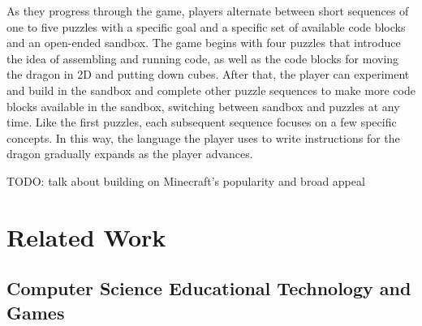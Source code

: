 \documentclass{sig-alternate}
\newcommand{\TODO}[1]{{\color{red} TODO: #1}}
\newcommand{\gametitle}{{\color{RoyalPurple} Dragon Architect Academy}}
\begin{document}
As they progress through the game, players alternate between short sequences of one to five puzzles with a specific goal and a specific set of available code blocks and an open-ended sandbox. 
The game begins with four puzzles that introduce the idea of assembling and running code, as well as the code blocks for moving the dragon in 2D and putting down cubes.
After that, the player can experiment and build in the sandbox and complete other puzzle sequences to make more code blocks available in the sandbox, switching between sandbox and puzzles at any time. 
Like the first puzzles, each subsequent sequence focuses on a few specific concepts. 
In this way, the language the player uses to write instructions for the dragon gradually expands as the player advances.

\TODO{talk about building on Minecraft's popularity and broad appeal}





\section{Related Work}

\subsection{Computer Science Educational Technology and Games}
\end{document}
